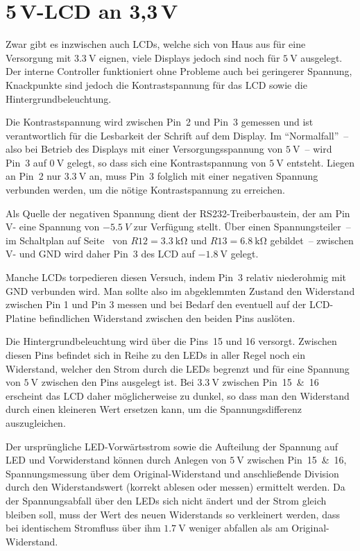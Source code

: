 \documentclass[paper=a4, parskip, numbers=noenddot, toc=listof, headsepline]{scrbook}
\begin{document}
		\section[5V-LCD an 3,3V]{5\,V-LCD an 3,3\,V}

			Zwar gibt es inzwischen auch LCDs, welche sich von Haus aus für eine Versorgung mit $\SI{3,3}{\volt}$ eignen, viele Displays jedoch sind noch für $\SI{5}{\volt}$ ausgelegt. Der interne Controller funktioniert ohne Probleme auch bei geringerer Spannung, Knackpunkte sind jedoch die Kontrastspannung für das LCD sowie die Hintergrundbeleuchtung.

			Die Kontrastspannung wird zwischen Pin~2 und Pin~3 gemessen und ist verantwortlich für die Lesbarkeit der Schrift auf dem Display. Im \enquote{Normalfall}~-- also bei Betrieb des Displays mit einer Versorgungsspannung von $\SI{5}{\volt}$~-- wird Pin~3 auf $\SI{0}{\volt}$ gelegt, so dass sich eine Kontrastspannung von $\SI{5}{\volt}$ entsteht. Liegen an Pin~2 nur $\SI{3,3}{\volt}$ an, muss Pin~3 folglich mit einer negativen Spannung verbunden werden, um die nötige Kontrastspannung zu erreichen.

			Als Quelle der negativen Spannung dient der RS232-Treiberbaustein, der am Pin V- eine Spannung von $\SI{-5,5}{V}$ zur Verfügung stellt. Über einen Spannungsteiler~-- im Schaltplan auf Seite~\pageref{fig:transmitterschematic} von $R12 = \SI{3,3}{\kilo\ohm}$ und $R13 = \SI{6,8}{\kilo\ohm}$ gebildet~-- zwischen V- und GND wird daher Pin~3 des LCD auf $\SI{-1,8}{\volt}$ gelegt.

			Manche LCDs torpedieren diesen Versuch, indem Pin~3 relativ niederohmig mit GND verbunden wird. Man sollte also im abgeklemmten Zustand den Widerstand zwischen Pin 1 und Pin 3 messen und bei Bedarf den eventuell auf der LCD-Platine befindlichen Widerstand zwischen den beiden Pins auslöten.

			Die Hintergrundbeleuchtung wird über die Pins~15 und 16 versorgt. Zwischen diesen Pins befindet sich in Reihe zu den LEDs in aller Regel noch ein Widerstand, welcher den Strom durch die LEDs begrenzt und für eine Spannung von $\SI{5}{\volt}$ zwischen den Pins ausgelegt ist. Bei $\SI{3,3}{\volt}$ zwischen Pin~15~\&~16 erscheint das LCD daher möglicherweise zu dunkel, so dass man den Widerstand durch einen kleineren Wert ersetzen kann, um die Spannungsdifferenz auszugleichen.

			Der ursprüngliche LED-Vorwärtsstrom sowie die Aufteilung der Spannung auf LED und Vorwiderstand können durch Anlegen von $\SI{5}{\volt}$ zwischen Pin~15~\&~16, Spannungsmessung über dem Original-Widerstand und anschließende Division durch den Widerstandswert (korrekt ablesen oder messen) ermittelt werden. Da der Spannungsabfall über den LEDs sich nicht ändert und der Strom gleich bleiben soll, muss der Wert des neuen Widerstands so verkleinert werden, dass bei identischem Stromfluss über ihm $\SI{1,7}{\volt}$ weniger abfallen als am Original-Widerstand.
\end{document}
